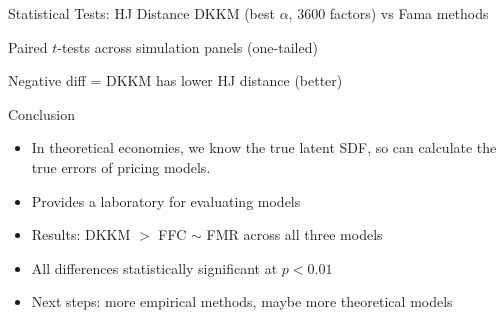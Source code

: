 \documentclass[aspectratio=169]{beamer}
\begin{document}
\begin{frame}{Statistical Tests: HJ Distance}
DKKM (best $\alpha$, 3600 factors) vs Fama methods

\vspace{0.3cm}
Paired $t$-tests across simulation panels (one-tailed)
  \centering

  \vspace{0.3cm}
  

  \vspace{0.3cm}
  \raggedright
  \small Negative diff = DKKM has lower HJ distance (better)
\end{frame}

\begin{frame}{Conclusion}
\begin{itemize}
\item In theoretical economies, we know the true latent SDF, so can calculate the true errors of pricing models.
\item Provides a laboratory for evaluating models
\item Results: DKKM $>$ FFC $\sim$ FMR across all three models
\item All differences statistically significant at $p < 0.01$
\item Next steps: more empirical methods, maybe more theoretical models
\end{itemize}
\end{frame}
\end{document}
